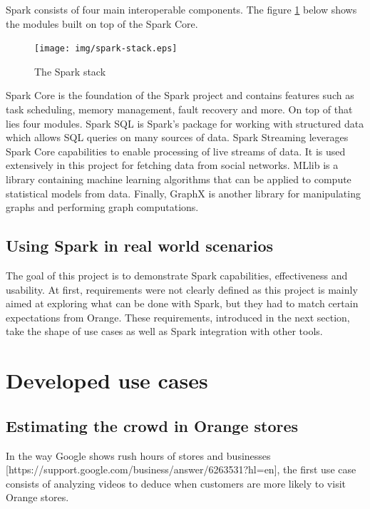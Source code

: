 \documentclass[11pt]{article}
\begin{document}
\newpage
Spark consists of four main interoperable components. The figure \ref{spark-stack} below shows the modules built on top of the Spark Core.

\begin{figure}[h!]
    \centering
    \texttt{[image: img/spark-stack.eps]}
    \caption{The Spark stack}
    \label{spark-stack}
\end{figure}

Spark Core is the foundation of the Spark project and contains features such as task scheduling, memory management, fault recovery and more. On top of that lies four modules.
Spark SQL is Spark's package for working with structured data which allows SQL queries on many sources of data.
Spark Streaming leverages Spark Core capabilities to enable processing of live streams of data. It is used extensively in this project for fetching data from social networks.
MLlib is a library containing machine learning algorithms that can be applied to compute statistical models from data.
Finally, GraphX is another library for manipulating graphs and performing graph computations. 

\subsection{Using Spark in real world scenarios}
The goal of this project is to demonstrate Spark capabilities, effectiveness and usability. At first, requirements were not clearly defined as this project is mainly aimed at exploring what can be done with Spark, but they had to match certain expectations from Orange. These requirements, introduced in the next section, take the shape of use cases as well as Spark integration with other tools.

\section{Developed use cases}
\subsection{Estimating the crowd in Orange stores}

In the way Google shows rush hours of stores and businesses [https://support.google.com/business/answer/6263531?hl=en], the first use case consists of analyzing videos to deduce when customers are more likely to visit Orange stores.
\end{document}
